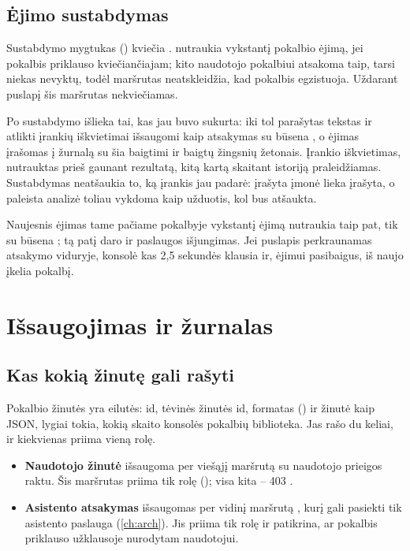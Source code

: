 \subsection{Ėjimo sustabdymas}\label{sec:chat:stop}

Sustabdymo mygtukas () kviečia
.  nutraukia vykstantį pokalbio
ėjimą, jei pokalbis priklauso kviečiančiajam; kito naudotojo pokalbiui atsakoma taip, tarsi niekas
nevyktų, todėl maršrutas neatskleidžia, kad pokalbis egzistuoja. Uždarant puslapį šis maršrutas
nekviečiamas.

Po sustabdymo išlieka tai, kas jau buvo sukurta: iki tol parašytas tekstas ir atlikti įrankių
iškvietimai išsaugomi kaip atsakymas su būsena , o ėjimas įrašomas į žurnalą su šia
baigtimi ir baigtų žingsnių žetonais. Įrankio iškvietimas, nutrauktas prieš gaunant rezultatą,
kitą kartą skaitant istoriją praleidžiamas. Sustabdymas neatšaukia to, ką įrankis jau padarė:
įrašyta įmonė lieka įrašyta, o paleista analizė toliau vykdoma kaip užduotis, kol bus atšaukta.

Naujesnis ėjimas tame pačiame pokalbyje vykstantį ėjimą nutraukia taip pat, tik su būsena
; tą patį daro ir paslaugos išjungimas. Jei puslapis perkraunamas atsakymo
viduryje, konsolė kas 2,5 sekundės klausia  ir,
ėjimui pasibaigus, iš naujo įkelia pokalbį.


\section{Išsaugojimas ir žurnalas}\label{sec:chat:persist}

\subsection{Kas kokią žinutę gali rašyti}

Pokalbio žinutės yra  eilutės: id, tėvinės žinutės id, formatas
() ir žinutė kaip JSON, lygiai tokia, kokią skaito konsolės pokalbių biblioteka.
Jas rašo du keliai, ir kiekvienas priima vieną rolę.

\begin{itemize}
  \item \textbf{Naudotojo žinutė} išsaugoma per viešąjį maršrutą
     su naudotojo prieigos raktu. Šis maršrutas
    priima tik rolę  (); visa kita -- 403
    .
  \item \textbf{Asistento atsakymas} išsaugomas per vidinį maršrutą
    , kurį gali pasiekti tik asistento
    paslauga (\cref{ch:arch}). Jis priima tik rolę  ir patikrina, ar pokalbis
    priklauso užklausoje nurodytam naudotojui.
\end{itemize}

